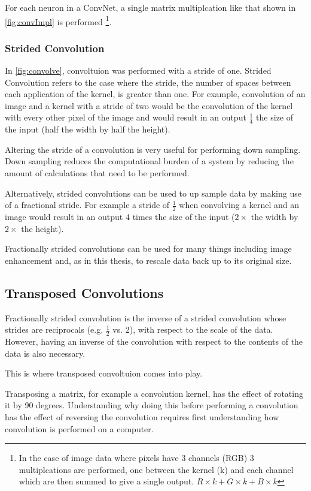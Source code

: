 For each neuron in a ConvNet, a single matrix multiplcation like that shown in \autoref{fig:convImpl} is performed \footnote{In the case of image data where pixels have 3 channels (RGB) 3 multiplcations are performed, one between the kernel (k) and each channel which are then summed to give a single output. $R\times k + G\times k + B\times k$}.

\subsubsection{Strided Convolution}
In \autoref{fig:convolve}, convoltuion was performed with a stride of one. Strided Convolution refers to the case where the stride, the number of spaces between each application of the kernel, is greater than one. For example, convolution of an image and a kernel with a stride of two would be the convolution of the kernel with every other pixel of the image and would result in an output $\frac{1}{4}$ the size of the input (half the width by half the height).

Altering the stride of a convolution is very useful for performing down sampling. Down sampling reduces the computational burden of a system by reducing the amount of calculations that need to be performed.

Alternatively, strided convolutions can be used to up sample data by making use of a fractional stride. For example a stride of $\frac{1}{2}$ when convolving a kernel and an image would result in an output 4 times the size of the input ($2\times$ the width by $2\times$ the height).

Fractionally strided convolutions can be used for many things including image enhancement\cite{radford2015unsupervised} and, as in this thesis, to rescale data back up to its original size.

\subsection{Transposed Convolutions}
Fractionally strided convolution is the inverse of a strided convolution whose strides are reciprocals (e.g. $\frac{1}{2}$ vs. 2), with respect to the scale of the data. However, having an inverse of the convolution with respect to the contents of the data is also necessary.

This is where transposed convoltuion comes into play. 

Transposing a matrix, for example a convolution kernel, has the effect of rotating it by 90 degrees. Understanding why doing this before performing a convolution has the effect of reversing the convolution requires first understanding how convolution is performed on a computer.

